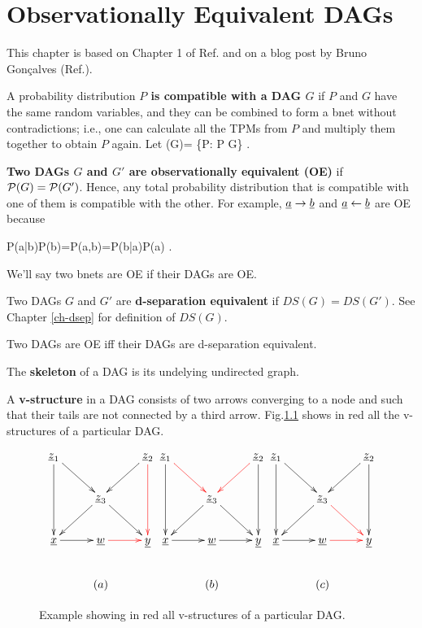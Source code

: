 \chapter{Observationally
 Equivalent DAGs}\label{ch-obs-equi}

This chapter is based on Chapter 1 of
Ref.\cite{pearl-2013book}
and on a blog post by 
Bruno Gon\c{c}alves 
(Ref.\cite{bruno-obs-equiv}).

A probability
distribution
{\bf $P$
is 
compatible 
with a DAG $G$}
if $P$ and $G$
have the
same random variables, and they 
can be
combined to form a bnet
without
contradictions;
i.e.,
one can calculate 
all
the TPMs from $P$
and multiply
them 
together to
obtain $P$ again.
Let 
\beq
\calp(G)=
\{P: P G\}
\;.
\eeq

 {\bf Two DAGs $G$ 
and $G'$ are observationally
equivalent (OE)}
if ${\cal P}(G)={\cal P}(G')$. Hence,
any total
probability distribution
that is compatible 
with one
of them
is compatible with
the other.
For example,
${\underline{a}}\rightarrow{\underline{b}}$
and ${\underline{a}}\leftarrow{\underline{b}}$
are OE because

\beq
P(a|b)P(b)=P(a,b)=P(b|a)P(a)
\label{eq-two-node-prob}
\;.
\eeq

We'll say two bnets are OE
if their DAGs are OE.

Two DAGs $G$ and $G'$
are
{\bf d-separation equivalent} if $DS(G)=DS(G')$.
See Chapter \ref{ch-dsep}
for definition of $DS(G)$.
\begin{claim}
Two DAGs are OE
iff their DAGs are d-separation equivalent.
\end{claim}


The {\bf
skeleton}
of a DAG is its
undelying undirected graph.

A {\bf v-structure}
in
a DAG consists of
two arrows 
converging to
a node and
such 
that their tails
are not 
connected 
by a third arrow.
Fig.\ref{fig-v-strucs}
shows in red all the v-structures 
of a particular DAG.

\begin{figure}[h!]
$$\xymatrix{
\rvz_1\ar[dd]\ar[rd]
&&\rvz_2\ar@[red][dd]\ar[ld]
\\
&\rvz_3\ar[dl]\ar[dr]
\\
\rvx\ar[r]&\rvw\ar@[red][r]&\rvy
\\
&(a)
}
\xymatrix{
\rvz_1\ar[dd]\ar@[red][rd]
&&\rvz_2\ar[dd]\ar@[red][ld]
\\
&\rvz_3\ar[dl]\ar[dr]
\\
\rvx\ar[r]&\rvw\ar[r]&\rvy
\\
&(b)
}
\xymatrix{
\rvz_1\ar[dd]\ar[rd]
&&\rvz_2\ar[dd]\ar[ld]
\\
&\rvz_3\ar[dl]\ar@[red][dr]
\\
\rvx\ar[r]&\rvw\ar@[red][r]&\rvy
\\
&(c)
}$$
\caption{Example showing in red
all v-structures 
of a particular DAG.}
\label{fig-v-strucs}
\end{figure}





